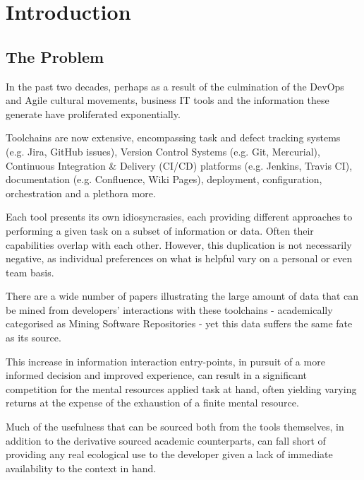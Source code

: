 \chapter{Introduction}

\section{The Problem}

In the past two decades, perhaps as a result of the culmination of the DevOps and Agile cultural movements, business IT tools and the information these generate have proliferated exponentially.  %

Toolchains are now extensive, encompassing task and defect tracking systems (e.g. Jira, GitHub issues), Version Control Systems (e.g. Git, Mercurial), Continuous Integration \& Delivery (CI/CD) platforms (e.g. Jenkins, Travis CI), documentation (e.g. Confluence, Wiki Pages), deployment, configuration, orchestration and a plethora more.


Each tool presents its own idiosyncrasies, each providing different approaches to performing a given task on a subset of information or data. Often their capabilities overlap with each other. However, this duplication is not necessarily negative, as individual preferences on what is helpful vary on a personal or even team basis.

There are a wide number of papers illustrating the large amount of data that can be mined from developers' interactions with these toolchains - academically categorised as Mining Software Repositories - yet this data suffers the same fate as its source.


This increase in information interaction entry-points, in pursuit of a more informed decision and improved experience, can result in a significant competition for the mental resources applied task at hand, often yielding varying returns at the expense of the exhaustion of a finite mental resource.

Much of the usefulness that can be sourced both from the tools themselves, in addition to the derivative sourced academic counterparts, can fall short of providing any real ecological use to the developer given a lack of immediate availability to the context in hand.

